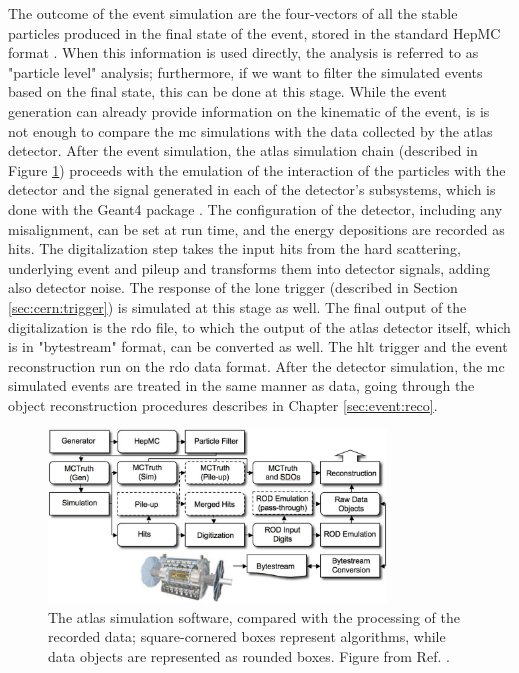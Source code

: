 The outcome of the event simulation are the four-vectors of all the stable particles produced in the final state of the event, stored in the standard HepMC format \cite{Dobbs:2001ck}.
When this information is used directly, the analysis is referred to as "particle level" analysis; furthermore, if we want to filter the simulated events based on the final state, this can be done at this stage. 
While the event generation can already provide information on the kinematic of the event, is is not enough to compare the \gls{mc} simulations with the 
data collected by the \gls{atlas} detector. 
After the event simulation, the \gls{atlas} simulation chain \cite{Aad:2010ah} (described in Figure \ref{fig:sim:chain}) proceeds with the emulation of the
interaction of the particles with the detector and the signal generated in each of the detector's subsystems, 
which is done with the Geant4 package \cite{Agostinelli:2002hh}. The configuration of the detector, including any misalignment, can be set at run time, and the energy depositions are recorded as hits. The digitalization step takes the input hits from the hard scattering, underlying event and pileup and transforms them into detector signals, adding also detector noise. The response of the \gls{lone} trigger (described in Section \ref{sec:cern:trigger}) is simulated at this stage as well. The final output of the digitalization is the \gls{rdo} file, to which the output of the \gls{atlas} detector itself, which is in "bytestream" format, can be converted as well. The \gls{hlt} trigger and the event reconstruction run on the \gls{rdo} data format. After the detector simulation, the \gls{mc} simulated events are treated in the same manner as data, going through the object reconstruction procedures
describes in Chapter \ref{sec:event:reco}.

\begin{figure}[h]
\begin{center}
    \includegraphics[width=0.8\textwidth]{figures/simul/outline_v2}
\end{center}
\caption{The \gls{atlas} simulation software, compared with the processing of the recorded data; square-cornered boxes represent algorithms, while data objects are represented as rounded boxes. Figure from Ref. \cite{Aad:2010ah}.}
 \label{fig:sim:chain}
\end{figure}

